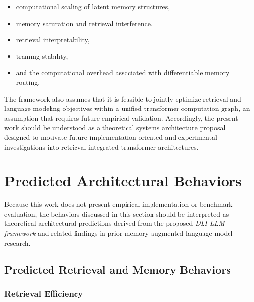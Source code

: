 \begin{itemize}
\item  computational scaling of latent memory structures,
\item  memory saturation and retrieval interference,
\item  retrieval interpretability,
\item  training stability,
\item and the computational overhead associated with differentiable memory routing.
\end{itemize}

The framework also assumes that it is feasible to jointly optimize retrieval and language modeling objectives within a unified transformer computation graph, an assumption that requires future empirical validation.
Accordingly, the present work should be understood as a theoretical systems architecture proposal designed to motivate future implementation-oriented and experimental investigations into retrieval-integrated transformer architectures.

\hypertarget{predicted-architectural-behaviors}{%
\section{Predicted Architectural Behaviors}}
\label{predicted-architectural-behaviors}

Because this work does not present empirical implementation or benchmark evaluation, the behaviors discussed in this section should be interpreted as theoretical architectural predictions derived from the proposed \emph{DLI-LLM framework} and related findings in prior memory-augmented language model research.

\hypertarget{predicted-retrieval-and-memory-behaviors}{%
\subsection{Predicted Retrieval and Memory Behaviors}}
\label{predicted-retrieval-and-memory-behaviors}

\hypertarget{retrieval-efficiency}{%
\subsubsection{Retrieval Efficiency}}
\label{retrieval-efficiency}


